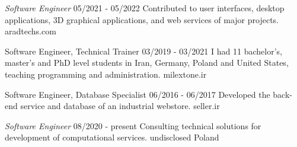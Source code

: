 \documentclass[a4paper,12pt]{memoir} %
\begin{document}







{\textit{Software Engineer}}
{05/2021 - 05/2022}
{Contributed to user interfaces, desktop applications, 3D graphical applications, and web services of major projects.}
{aradtechs.com}


{Software Engineer, Technical Trainer}
{03/2019 - 03/2021}
{I had 11 bachelor's, master's and PhD level students in Iran, Germany, Poland and United States, teaching programming and administration.}
{milextone.ir}


{Software Engineer, Database Specialist}
{06/2016 - 06/2017}
{Developed the back-end service and database of an industrial webstore.}
{seller.ir}


\Sep %




{\textit{Software Engineer}}
{08/2020 - present}
{Consulting technical solutions for development of computational services.}
{undisclosed}
{Poland}

\end{document}
